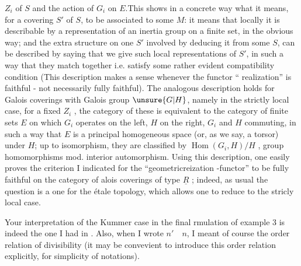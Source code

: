 $Z_i$ of $S$ and the action of $G_i$ on $E$.This shows in a  concrete way what it means,  for a covering $S'$ of $S$, to be associated to some $M$: it means that locally it is describable by a representation of an inertia group on a finite set, in the obvious way; and the extra structure on one $S'$ involved by deducing it from some $S$, can be described by saying that we give such local representations of $S'$, in such a way that they match together i.e. satisfy some rather evident compatibility condition (This description makes a sense whenever the functor `` realization'' is faithful - not necessarily fully faithful). The analogous description holds for Galois coverings with Galois group $\unsure{G|H}$, namely in the strictly local case, for a fixed $Z_i$ , the category of these is equivalent to the category of finite sets $E$ on which $G_i$ operates on the left, $H$ on the right, $G_i$ and $H$ commuting, in such a way that $E$ is a principal homogeneous space (or, as we say, a torsor) under $H$; up to isomorphism, they are classified by $\operatorname{Hom}(G_i,H)/H$ , group homomorphisms mod. interior automorphism. Using  this description, one easily proves the criterion I indicated for the ``geometricreization -functor'' to be fully faithful on the category of alois coverings of type $\underline{R}$ ; indeed, as usual the question is a  one for the étale topology, which allows one to  reduce to the stricly local case.

Your interpretation of the Kummer case in the final rmulation of example 3 is indeed the one I had in . Also, when I wrote $n'\quad n$, I meant of course the order relation of divisibility (it may be convevient to introduce this order relation explicitly, for simplicity of notations).
